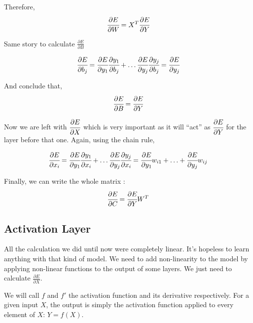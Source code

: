 Therefore,
\begin{equation}
	\cfrac{\partial E}{\partial W} = X^T\cfrac{\partial E}{\partial Y}
\end{equation}

Same story to calculate $\frac{\partial E}{\partial B}$

\begin{equation}
	\cfrac{\partial E}{\partial b_j} = \cfrac{\partial E}{\partial y_1}\cfrac{\partial y_1}{\partial b_j} + \ldots \cfrac{\partial E}{\partial y_j}\cfrac{\partial y_j}{\partial b_j} = \cfrac{\partial E}{\partial y_j} 
\end{equation}

And conclude that,
\begin{equation}
	\cfrac{\partial E}{\partial B} = \cfrac{\partial E}{\partial Y}
\end{equation}

Now we are left with $\cfrac{\partial E}{\partial X}$ which is very important as it will “act” as $\cfrac{\partial E}{\partial Y}$ for the layer before that one. Again, using the chain rule,

\begin{equation}
	\cfrac{\partial E}{\partial x_i} = \cfrac{\partial E}{\partial y_1}\cfrac{\partial y_1}{\partial x_i} + \ldots \cfrac{\partial E}{\partial y_j}\cfrac{\partial y_j}{\partial x_i} = \cfrac{\partial E}{\partial y_1} w_{i1} + \ldots + \cfrac{\partial E}{\partial y_j} w_{ij} 
\end{equation}

Finally, we can write the whole matrix :
\begin{equation}
	\cfrac{\partial E}{\partial C} = \cfrac{\partial E}{\partial Y}W^T
\end{equation}


\subsection{Activation Layer}
All the calculation we did until now were completely linear. It's hopeless to learn anything with that kind of model. We need to add non-linearity to the model by applying non-linear functions to the output of some layers. We just need to calculate $\frac{\partial E}{\partial X}$.

We will call $f$ and $f'$ the activation function and its derivative respectively. For a given input $X$, the output is simply the activation function applied to every element of $X$: $Y = f(X)$. 

